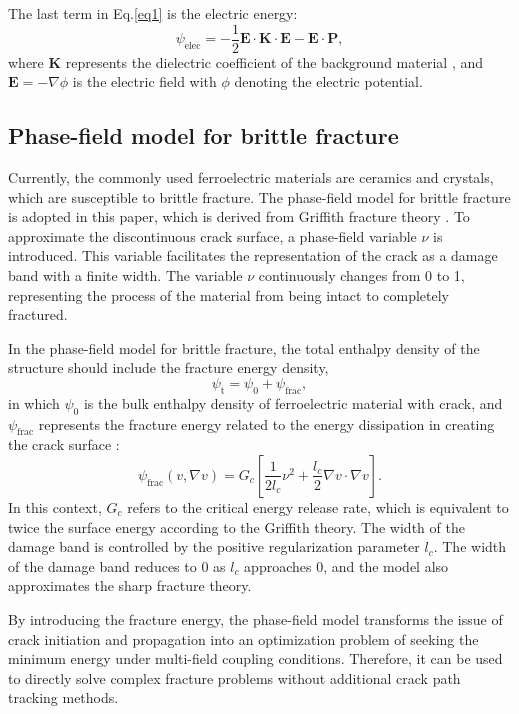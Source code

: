 \documentclass[times,fleqn,11pt]{elsarticle}
\begin{document}
The last term in Eq.\eqref{eq1} is the electric energy:
\begin{equation}
    \psi_\mathrm{elec}=-\frac{1}{2}\mathbf{E}\cdot \mathbf{K} \cdot \mathbf{E}-\mathbf{E}\cdot\mathbf{P},
\end{equation} 
where $\mathbf{K}$ represents the dielectric coefficient of the background material \cite{li_effect_2002,wang_phase_2009}, and $\mathbf{E}=-\nabla \phi$ is the electric field with $\phi$ denoting the electric potential.

\subsection{Phase-field model for brittle fracture}
Currently, the commonly used ferroelectric materials are ceramics and crystals, which are susceptible to brittle fracture. The phase-field model for brittle fracture is adopted in this paper, which is derived from Griffith fracture theory \cite{francfort_revisiting_1998, bourdin_numerical_2000}. To approximate the discontinuous crack surface, a phase-field variable $\nu$ is introduced. This variable facilitates the representation of the crack as a damage band with a finite width. The variable $\nu$ continuously changes from 0 to 1, representing the process of the material from being intact to completely fractured. 

In the phase-field model for brittle fracture, the total enthalpy density of the structure should include the fracture energy density,
\begin{equation}
    \psi_{\mathrm{t}}=\psi_0+\psi_{\mathrm{frac}},
\end{equation}
in which $\psi_0$ is the bulk enthalpy density of ferroelectric material with crack, and $\psi_\mathrm{frac}$ represents the fracture energy related to the energy dissipation in creating the crack surface \cite{miehe_thermodynamically_2010}:
\begin{equation}\label{eq9}
    \psi_{\mathrm{frac}}(v,\nabla v)=G_c\left[\frac{1}{2l_c}\nu^2+\frac{l_c}{2}\nabla v\cdot \nabla v\right].
\end{equation}
In this context,  $G_c$ refers to the critical energy release rate, which is equivalent to twice the surface energy according to the Griffith theory. The width of the damage band is controlled by the positive regularization parameter $l_c$. The width of the damage band reduces to 0 as $l_c$ approaches 0, and the model also approximates the sharp fracture theory.

By introducing the fracture energy, the phase-field model transforms the issue of crack initiation and propagation  into an optimization problem of seeking the minimum energy under multi-field coupling conditions. Therefore, it can be used to directly solve complex fracture problems without additional crack path tracking methods.
\end{document}
